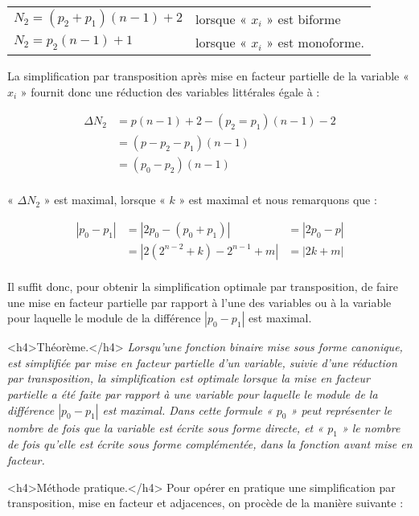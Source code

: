 \begin{tabular}{ll}
$N_2 = (p_2 + p_1) (n-1) +2$  & lorsque « $x_i$ » est biforme \\
$N_2 = p_2 (n-1) + 1$ & lorsque « $x_i$ » est monoforme. \\
\end{tabular}

La simplification par transposition après mise en facteur partielle de la variable « $x_i$ » fournit donc une réduction des variables littérales égale à : 

\[  
\begin{aligned}
\Delta N_2    & = p (n-1) +2 - (p_2 = p_1) (n-1) -2 \\
              & = (p - p_2 - p_1) (n -1) \\
              & = (p_0 - p_2) (n -1) \\
\end{aligned} 
\]                        

\centerline {   }

« $\Delta N_2$ » est maximal, lorsque « $k$ » est maximal et nous remarquons que : 

\[  \begin{aligned}
 | p_0 - p_1 | & = | 2 p_0 - (p_0 + p_1) | & = | 2 p_0 - p | \\
               & = | 2 (2^{n-2} + k) -2^{n-1} + m |  & = | 2k + m |\\
\end{aligned} 
\] 

Il suffit donc, pour obtenir la simplification optimale par transposition, de faire une mise en facteur partielle par rapport 
à l'une des variables ou à la variable pour laquelle le module de la différence  $| p_0 - p_1 |$ est maximal. 


<h4>Théorème.</h4> \emph{Lorsqu'une fonction binaire mise sous forme canonique, est simplifiée par mise en facteur partielle d'un variable, suivie d'une réduction par transposition, la simplification est optimale lorsque la mise en facteur partielle a été faite par rapport à une variable pour laquelle le module de la différence $|p_0 - p_1|$ est maximal. Dans cette formule « $p_0$ » peut représenter le nombre de fois que la variable est écrite sous forme directe, et « $p_1$ »  le nombre de fois qu'elle est écrite sous forme complémentée, dans la fonction avant mise en facteur.}


<h4>Méthode pratique.</h4> Pour opérer en pratique une simplification par transposition, mise en facteur et adjacences, on procède de la manière suivante : 

